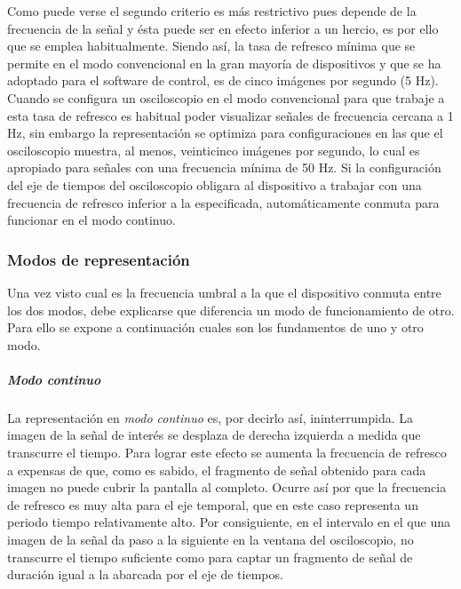 Como puede verse el segundo criterio es más restrictivo pues depende de la
frecuencia de la señal y ésta puede ser en efecto inferior a un hercio, es
por ello que se emplea habitualmente. Siendo así, la tasa de refresco
mínima que se permite en el modo convencional en la gran mayoría de
dispositivos y que se ha adoptado para el software de control, es de cinco
imágenes por segundo (5 Hz). Cuando se configura un osciloscopio en el modo
convencional para que trabaje a esta tasa de refresco es habitual poder
visualizar señales de frecuencia cercana a 1 Hz, sin embargo la
representación se optimiza para configuraciones en las que el osciloscopio
muestra, al menos, veinticinco imágenes por segundo, lo cual es apropiado
para señales con una frecuencia mínima de 50 Hz. Si la configuración del
eje de tiempos del osciloscopio obligara al dispositivo a trabajar con una
frecuencia de refresco inferior a la especificada, automáticamente conmuta
para funcionar en el modo continuo.


\subsubsection{Modos de representación}

Una vez visto cual es la frecuencia umbral a la que el dispositivo conmuta
entre los dos modos, debe explicarse que diferencia un modo de
funcionamiento de otro. Para ello se expone a continuación cuales son los
fundamentos de uno y otro modo.


\subparagraph{Modo continuo}

La representación en \emph{modo continuo} es, por decirlo así,
ininterrumpida. La imagen de la señal de interés se desplaza de derecha
izquierda a medida que transcurre el tiempo. Para lograr este efecto se
aumenta la frecuencia de refresco a expensas de que, como es sabido, el
fragmento de señal obtenido para cada imagen no puede cubrir la pantalla al
completo. Ocurre así por que la frecuencia de refresco es muy alta para el
eje temporal, que en este caso representa un periodo tiempo relativamente
alto. Por consiguiente, en el intervalo en el que una imagen de la señal da
paso a la siguiente en la ventana del osciloscopio, no transcurre el tiempo
suficiente como para captar un fragmento de señal de duración igual a la
abarcada por el eje de tiempos.

